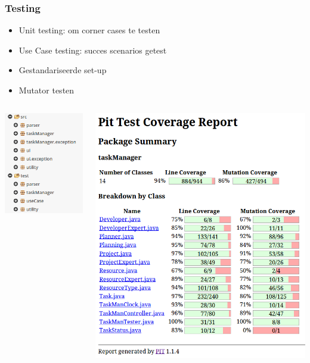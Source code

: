 \documentclass{beamer}
\begin{document}
\begin{frame}
\frametitle {Testing}
\begin{itemize}
    \item Unit testing: om corner cases te testen
    \item Use Case testing: succes scenarios getest
    \item Gestandariseerde set-up
    \item Mutator testen
\end{itemize}
\begin{columns}
    \begin{column}{.4\paperwidth}
        \includegraphics[width=0.25\paperwidth]{figures/test.png}
    \end{column}
    \begin{column}{.5\paperwidth}
   		\includegraphics[scale=0.35]{figures/PITcoverage}
    \end{column}
\end{columns}
\end{frame}
\end{document}
